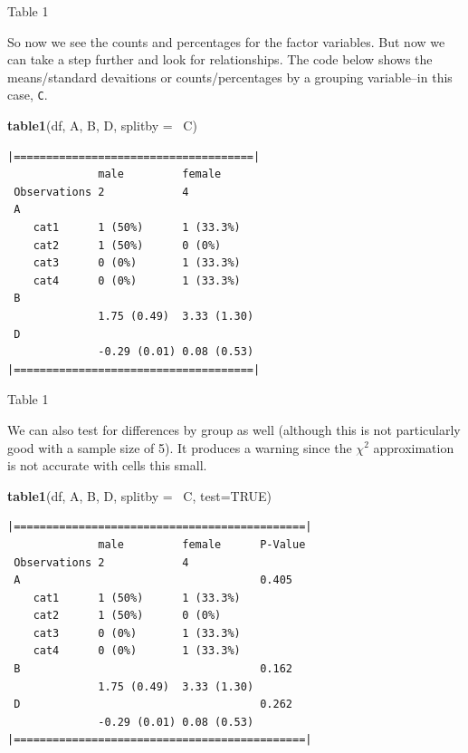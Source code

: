 \documentclass[10pt,ignorenonframetext,]{beamer}
\newenvironment{Shaded}{\begin{snugshade}}{\end{snugshade}}
\newcommand{\KeywordTok}[1]{\textcolor[rgb]{0.13,0.29,0.53}{\textbf{{#1}}}}
\newcommand{\DataTypeTok}[1]{\textcolor[rgb]{0.13,0.29,0.53}{{#1}}}
\newcommand{\OtherTok}[1]{\textcolor[rgb]{0.56,0.35,0.01}{{#1}}}
\newcommand{\NormalTok}[1]{{#1}}
\begin{document}
\begin{frame}[fragile]{Table 1}

So now we see the counts and percentages for the factor variables. But
now we can take a step further and look for relationships. The code
below shows the means/standard devaitions or counts/percentages by a
grouping variable--in this case, \texttt{C}.

\begin{Shaded}
\begin{Highlighting}[]
\KeywordTok{table1}\NormalTok{(df, A, B, D,}
       \DataTypeTok{splitby =} \NormalTok{~C)}
\end{Highlighting}
\end{Shaded}

\tiny
\begin{verbatim}
|=====================================|
              male         female     
 Observations 2            4          
 A                                    
    cat1      1 (50%)      1 (33.3%)  
    cat2      1 (50%)      0 (0%)     
    cat3      0 (0%)       1 (33.3%)  
    cat4      0 (0%)       1 (33.3%)  
 B                                    
              1.75 (0.49)  3.33 (1.30)
 D                                    
              -0.29 (0.01) 0.08 (0.53)
|=====================================|
\end{verbatim}

\end{frame}

\begin{frame}[fragile]{Table 1}

We can also test for differences by group as well (although this is not
particularly good with a sample size of 5). It produces a warning since
the \(\chi^2\) approximation is not accurate with cells this small.

\begin{Shaded}
\begin{Highlighting}[]
\KeywordTok{table1}\NormalTok{(df, A, B, D,}
       \DataTypeTok{splitby =} \NormalTok{~C,}
       \DataTypeTok{test=}\OtherTok{TRUE}\NormalTok{)}
\end{Highlighting}
\end{Shaded}

\tiny
\begin{verbatim}
|=============================================|
              male         female      P-Value
 Observations 2            4                  
 A                                     0.405  
    cat1      1 (50%)      1 (33.3%)          
    cat2      1 (50%)      0 (0%)             
    cat3      0 (0%)       1 (33.3%)          
    cat4      0 (0%)       1 (33.3%)          
 B                                     0.162  
              1.75 (0.49)  3.33 (1.30)        
 D                                     0.262  
              -0.29 (0.01) 0.08 (0.53)        
|=============================================|
\end{verbatim}

\end{frame}
\end{document}
